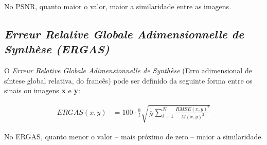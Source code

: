 No PSNR, quanto maior o valor, maior a similaridade entre as imagens.

\subsection{\textit{Erreur Relative Globale Adimensionnelle de Synthèse (ERGAS)}}
\label{alg:ergas}

O \textit{Erreur Relative Globale Adimensionnelle de Synthèse} \cite{wald_quality_2000} (Erro adimensional de síntese global relativa, do francês) pode ser definido da seguinte forma entre os sinais ou imagens \textbf{x} e \textbf{y}:

\begin{equation}
\begin{split}
    ERGAS(x,y)      &= 100\cdot \frac{h}{l} \sqrt{\frac{1}{N} \sum_{i=1}^{N} \frac{RMSE(x,y)^{2}}{M(x,y)^{2}}}
\end{split}
\end{equation}

No ERGAS, quanto menor o valor -- mais próximo de zero -- maior a similaridade.